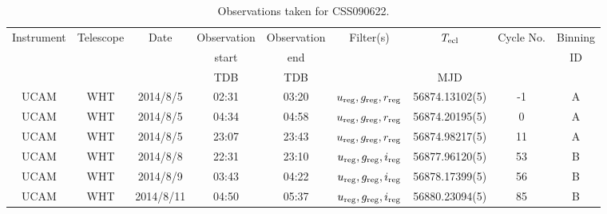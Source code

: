\begin{table}
	\begin{center}
		\caption{Observations taken for CSS090622.}
		\label{table:observing:observation logs CSS090622}
		\begin{tabular}{ccccccccc}
			\hline
			Instrument & Telescope & Date & Observation  & Observation  & Filter(s) & $T_{\rm ecl}$ & Cycle No. & Binning \\
			 &  &  &  start &  end &  &  &  & ID \\
			 &  &  & TDB & TDB &  & MJD &  &  \\
			\hline
			\hline
			UCAM & WHT & 2014/8/5  & 02:31 & 03:20 & $u_{\rm reg},g_{\rm reg},r_{\rm reg}$ & 56874.13102(5) & -1 & A \\
			UCAM & WHT & 2014/8/5  & 04:34 & 04:58 & $u_{\rm reg},g_{\rm reg},r_{\rm reg}$ & 56874.20195(5) &  0 & A \\
			UCAM & WHT & 2014/8/5  & 23:07 & 23:43 & $u_{\rm reg},g_{\rm reg},r_{\rm reg}$ & 56874.98217(5) & 11 & A \\
			UCAM & WHT & 2014/8/8  & 22:31 & 23:10 & $u_{\rm reg},g_{\rm reg},i_{\rm reg}$ & 56877.96120(5) & 53 & B \\
			UCAM & WHT & 2014/8/9  & 03:43 & 04:22 & $u_{\rm reg},g_{\rm reg},i_{\rm reg}$ & 56878.17399(5) & 56 & B \\
			UCAM & WHT & 2014/8/11 & 04:50 & 05:37 & $u_{\rm reg},g_{\rm reg},i_{\rm reg}$ & 56880.23094(5) & 85 & B \\
		   \hline
		\end{tabular}
	\end{center}
\end{table}